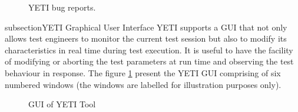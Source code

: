 \begin{figure}[h]
	\centering
	\caption{YETI bug reports.}
\end{figure}

subsection{YETI Graphical User Interface}
YETI supports a GUI that not only allows test engineers to monitor the current test session but also to modify its characteristics in real time during test execution. It is useful to have the facility of modifying or aborting the test parameters at run time and observing the test behaviour in response. The figure \ref{fig:yetiGUI} present the YETI GUI comprising of six numbered windows (the windows are labelled for illustration purposes only).

\begin{figure}[h]
	\centering
	\label{fig:yetiGUI}
	\caption{GUI of YETI Tool}
\end{figure}

